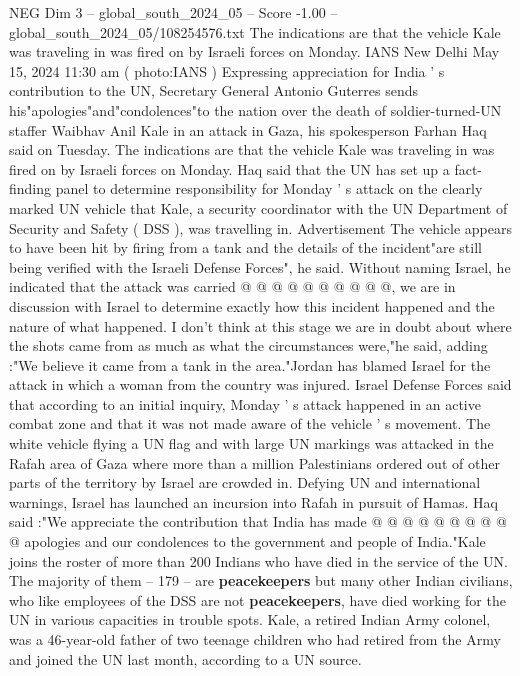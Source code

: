 \begin{textsample}{NEG Dim 3 – global\_south\_2024\_05 – Score -1.00 – global\_south\_2024\_05/108254576.txt}  \label{ex:f3_neg_349}
The indications are that the vehicle Kale was traveling in was fired on by Israeli forces on Monday.
IANS New Delhi May 15, 2024 11:30 am ( photo:IANS ) Expressing appreciation for India ' s contribution to the UN, Secretary General Antonio Guterres sends his"apologies"and"condolences"to the nation over the death of soldier-turned-UN staffer Waibhav Anil Kale in an attack in Gaza, his spokesperson Farhan Haq said on Tuesday.
The indications are that the vehicle Kale was traveling in was fired on by Israeli forces on Monday.
Haq said that the UN has set up a fact-finding panel to determine responsibility for Monday ' s attack on the clearly marked UN vehicle that Kale, a security coordinator with the UN Department of Security and Safety ( DSS ), was travelling in.
Advertisement The vehicle appears to have been hit by firing from a tank and the details of the incident"are still being verified with the Israeli Defense Forces", he said.
Without naming Israel, he indicated that the attack was carried @ @ @ @ @ @ @ @ @ @, we are in discussion with Israel to determine exactly how this incident happened and the nature of what happened.
I don't think at this stage we are in doubt about where the shots came from as much as what the circumstances were,"he said, adding :"We believe it came from a tank in the area."Jordan has blamed Israel for the attack in which a woman from the country was injured.
Israel Defense Forces said that according to an initial inquiry, Monday ' s attack happened in an active combat zone and that it was not made aware of the vehicle ' s movement.
The white vehicle flying a UN flag and with large UN markings was attacked in the Rafah area of Gaza where more than a million Palestinians ordered out of other parts of the territory by Israel are crowded in.
Defying UN and international warnings, Israel has launched an incursion into Rafah in pursuit of Hamas.
Haq said :"We appreciate the contribution that India has made @ @ @ @ @ @ @ @ @ @ apologies and our condolences to the government and people of India."Kale joins the roster of more than 200 Indians who have died in the service of the UN.
The majority of them -- 179 -- are \textbf{peacekeepers} but many other Indian civilians, who like employees of the DSS are not \textbf{peacekeepers}, have died working for the UN in various capacities in trouble spots.
Kale, a retired Indian Army colonel, was a 46-year-old father of two teenage children who had retired from the Army and joined the UN last month, according to a UN source.

\end{textsample}
